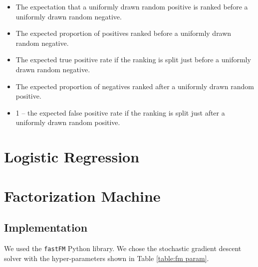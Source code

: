         \begin{itemize}
            \item The expectation that a uniformly drawn random positive is ranked before a uniformly drawn random negative.
            \item The expected proportion of positives ranked before a uniformly drawn random negative.
            \item The expected true positive rate if the ranking is split just before a uniformly drawn random negative.
            \item The expected proportion of negatives ranked after a uniformly drawn random positive.
            \item 1 – the expected false positive rate if the ranking is split just after a uniformly drawn random positive.
        \end{itemize}



\section{Logistic Regression}


\section{Factorization Machine}

    \subsection{Implementation}

        We used the \verb|fastFM|\cite{bayer_fastfm:_2016} Python library.
        We chose the stochastic gradient descent solver with the hyper-parameters shown in Table \ref{table:fm param}.

